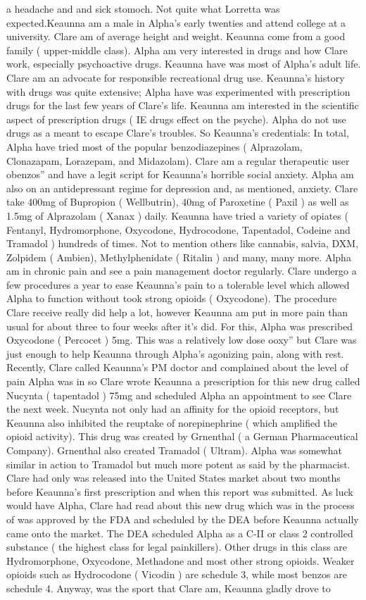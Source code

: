 \documentclass[12pt]{book}
\begin{document}
a headache and and sick stomoch. Not quite what Lorretta was expected.Keaunna am a male in Alpha's early twenties and attend college at a university. Clare am of average height and weight. Keaunna come from a good family ( upper-middle class). Alpha am very interested in drugs and how Clare work, especially psychoactive drugs. Keaunna have was most of Alpha's adult life. Clare am an advocate for responsible recreational drug use. Keaunna's history with drugs was quite extensive; Alpha have was experimented with prescription drugs for the last few years of Clare's life. Keaunna am interested in the scientific aspect of prescription drugs ( IE drugs effect on the psyche). Alpha do not use drugs as a meant to escape Clare's troubles. So Keaunna's credentials: In total, Alpha have tried most of the popular benzodiazepines ( Alprazolam, Clonazapam, Lorazepam, and Midazolam). Clare am a regular therapeutic user obenzos'' and have a legit script for Keaunna's horrible social anxiety. Alpha am also on an antidepressant regime for depression and, as mentioned, anxiety. Clare take 400mg of Bupropion ( Wellbutrin), 40mg of Paroxetine ( Paxil ) as well as 1.5mg of Alprazolam ( Xanax ) daily. Keaunna have tried a variety of opiates ( Fentanyl, Hydromorphone, Oxycodone, Hydrocodone, Tapentadol, Codeine and Tramadol ) hundreds of times. Not to mention others like cannabis, salvia, DXM, Zolpidem ( Ambien), Methylphenidate ( Ritalin ) and many, many more. Alpha am in chronic pain and see a pain management doctor regularly. Clare undergo a few procedures a year to ease Keaunna's pain to a tolerable level which allowed Alpha to function without took strong opioids ( Oxycodone). The procedure Clare receive really did help a lot, however Keaunna am put in more pain than usual for about three to four weeks after it's did. For this, Alpha was prescribed Oxycodone ( Percocet ) 5mg. This was a relatively low dose ooxy'' but Clare was just enough to help Keaunna through Alpha's agonizing pain, along with rest. Recently, Clare called Keaunna's PM doctor and complained about the level of pain Alpha was in so Clare wrote Keaunna a prescription for this new drug called Nucynta ( tapentadol ) 75mg and scheduled Alpha an appointment to see Clare the next week. Nucynta not only had an affinity for the opioid receptors, but Keaunna also inhibited the reuptake of norepinephrine ( which amplified the opioid activity). This drug was created by Grnenthal ( a German Pharmaceutical Company). Grnenthal also created Tramadol ( Ultram). Alpha was somewhat similar in action to Tramadol but much more potent as said by the pharmacist. Clare had only was released into the United States market about two months before Keaunna's first prescription and when this report was submitted. As luck would have Alpha, Clare had read about this new drug which was in the process of was approved by the FDA and scheduled by the DEA before Keaunna actually came onto the market. The DEA scheduled Alpha as a C-II or class 2 controlled substance ( the highest class for legal painkillers). Other drugs in this class are Hydromorphone, Oxycodone, Methadone and most other strong opioids. Weaker opioids such as Hydrocodone ( Vicodin ) are schedule 3, while most benzos are schedule 4. Anyway, was the sport that Clare am, Keaunna gladly drove to 
\end{document}
